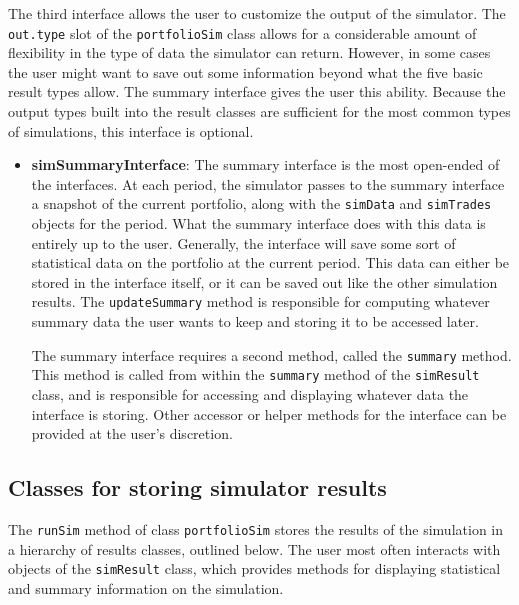 \documentclass{article}
\begin{document}
The third interface allows the user to customize the output of the
simulator.  The \texttt{out.type} slot of the \texttt{portfolioSim}
class allows for a considerable amount of flexibility in the type of
data the simulator can return.  However, in some cases the user might
want to save out some information beyond what the five basic result
types allow.  The summary interface gives the user this ability.
Because the output types built into the result classes are sufficient
for the most common types of simulations, this interface is optional.

\begin{itemize}

\item{\bf{simSummaryInterface}}: The summary interface is the most
open-ended of the interfaces.  At each period, the simulator passes to
the summary interface a snapshot of the current portfolio, along with
the \texttt{simData} and \texttt{simTrades} objects for the period.
What the summary interface does with this data is entirely up to the
user.  Generally, the interface will save some sort of statistical
data on the portfolio at the current period.  This data can either be
stored in the interface itself, or it can be saved out like the other
simulation results.  The \texttt{updateSummary} method is responsible
for computing whatever summary data the user wants to keep and storing
it to be accessed later.

The summary interface requires a second method, called the
\texttt{summary} method.  This method is called from within the
\texttt{summary} method of the \texttt{simResult} class, and is
responsible for accessing and displaying whatever data the interface
is storing.  Other accessor or helper methods for the interface can be
provided at the user's discretion.

\end{itemize}


\subsection{Classes for storing simulator results}

The \texttt{runSim} method of class \texttt{portfolioSim} stores the
results of the simulation in a hierarchy of results classes, outlined
below.  The user most often interacts with objects of the
\texttt{simResult} class, which provides methods for displaying
statistical and summary information on the simulation.
\end{document}
